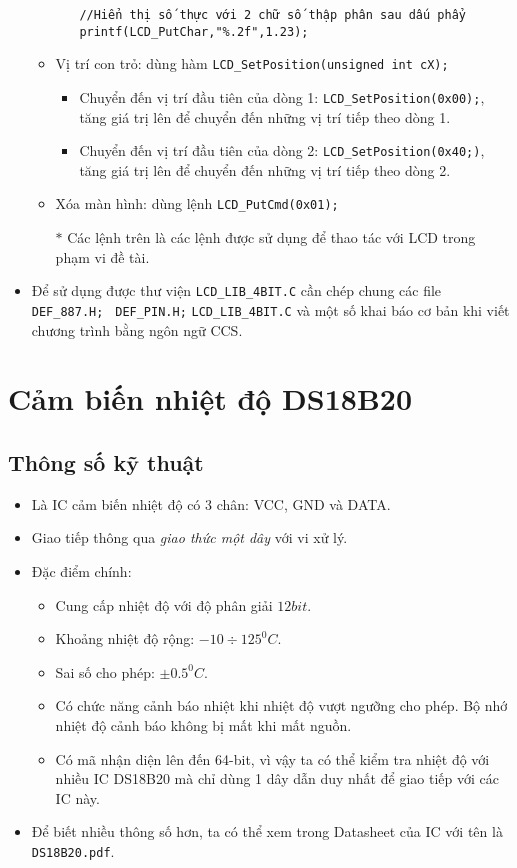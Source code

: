\begin{itemize}
\begin{itemize}
\begin{itemize}
\begin{verbatim}
//Hiển thị số thực với 2 chữ số thập phân sau dấu phẩy
printf(LCD_PutChar,"%.2f",1.23); 
\end{verbatim}
\end{itemize}
\item Vị trí con trỏ: dùng hàm \verb|LCD_SetPosition(unsigned int cX);|
\begin{itemize}
\item Chuyển đến vị trí đầu tiên của dòng 1: \verb|LCD_SetPosition(0x00);|, tăng giá trị lên để chuyển đến những vị trí tiếp theo dòng 1.
\item Chuyển đến vị trí đầu tiên của dòng 2: \verb|LCD_SetPosition(0x40;)|, tăng giá trị lên để chuyển đến những vị trí tiếp theo dòng 2.
\end{itemize}
\item Xóa màn hình: dùng lệnh \verb|LCD_PutCmd(0x01);|
\item[$\ast$] Các lệnh trên là các lệnh được sử dụng để thao tác với LCD trong phạm vi đề tài.
\end{itemize}
\item Để sử dụng được thư viện \verb|LCD_LIB_4BIT.C| cần chép chung các file \verb|DEF_887.H;| \verb| DEF_PIN.H;| \verb|LCD_LIB_4BIT.C| và một số khai báo cơ bản khi viết chương trình bằng ngôn ngữ CCS.
\end{itemize}
\section{Cảm biến nhiệt độ DS18B20}
\subsection{Thông số kỹ thuật}
\begin{itemize}
\item Là IC cảm biến nhiệt độ có 3 chân: VCC, GND và DATA.
\item Giao tiếp thông qua \textit{giao thức một dây} với vi xử lý.
\item Đặc điểm chính:
\begin{itemize}
\item Cung cấp nhiệt độ với độ phân giải $12bit$.
\item Khoảng nhiệt độ rộng: $-10 \div 125^0C$.
\item Sai số cho phép: $\pm0.5^0C$.
\item Có chức năng cảnh báo nhiệt khi nhiệt độ vượt ngưỡng cho phép. Bộ nhớ nhiệt độ cảnh báo không bị mất khi mất nguồn.
\item Có mã nhận diện lên đến 64-bit, vì vậy ta có thể kiểm tra nhiệt độ với nhiều IC DS18B20 mà chỉ dùng 1 dây dẫn duy nhất để giao tiếp với các IC này.
\end{itemize}
\item Để biết nhiều thông số hơn, ta có thể xem trong Datasheet của IC với tên là \verb|DS18B20.pdf|.
\end{itemize}
